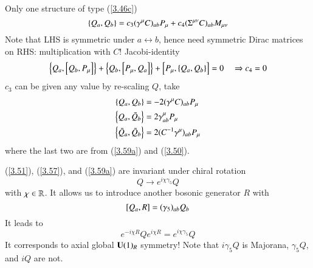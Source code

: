 Only one structure of type (\ref{3.46c})
\begin{equation}
   \acomm{Q_a}{Q_b} = c_3(\gamma^\mu C )_{ab} P_\mu + c_4 (\Sigma^{\mu\nu} C)_{ab} M_{\mu\nu} \label{3.58}
\end{equation}
Note that LHS is symmetric under $a\leftrightarrow b$, hence need symmetric Dirac matrices on RHS: multiplication with $C$! Jacobi-identity
\begin{equation*}
   \acomm{Q_a}{\comm{Q_b}{P_\mu}} + \acomm{Q_b}{\comm{P_\mu}{Q_a}} + \comm{P_\mu}{\acomm{Q_a}{Q_b}} = 0 \quad \Rightarrow c_4 = 0
\end{equation*}
$c_3$ can be given any value by re-scaling $Q$, take
\begin{subequations}\label{3.59}
\begin{align}
   \acomm{Q_a}{Q_b} &= -2 (\gamma^\mu C)_{ab} P_\mu \label{3.59a} \\
   \acomm{Q_a}{\bar Q_b} &= 2 \gamma^\mu_{ab} P_\mu \label{3.59b} \\
   \acomm{\bar Q_a}{\bar Q_b} &= 2(C^{-1} \gamma^\mu)_{ab} P_\mu \label{3.59c}
\end{align} 
\end{subequations}
where the last two are from (\ref{3.59a}) and (\ref{3.50}).

(\ref{3.51}), (\ref{3.57}), and (\ref{3.59a}) are invariant under chiral rotation
\begin{equation}
   Q \rightarrow e^{i \chi \gamma_5} Q \label{3.60}
\end{equation}
with $\chi \in \mathbb{R}$.
It allows us to introduce another bosonic generator $R$ with
\begin{equation}
   \comm{Q_a}{R} = (\gamma_5)_{ab} Q_b \label{3.61}
\end{equation}
It leads to
\begin{equation}
   e^{-i \chi R} Q e^{i \chi R} = e^{i \chi \gamma_5} Q \label{3.62}
\end{equation}
It corresponds to axial global $\mathbf{U}(1)_R$ symmetry! Note that $i\gamma_5 Q$ is Majorana, $\gamma_5 Q$, and $i Q$ are not. 

